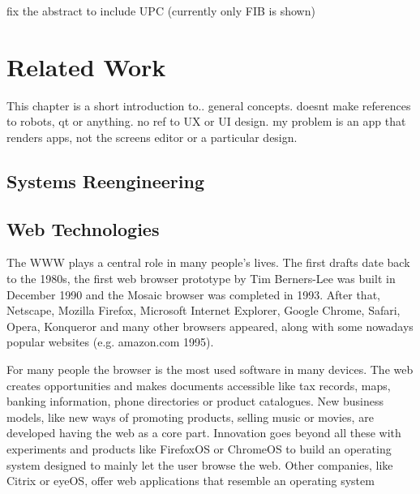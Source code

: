 
fix the abstract to include UPC (currently only FIB is shown)
\cite{Darwin} \cite{Crockford} \cite{Stefanov} \cite{AngularJSGuide} \cite{Fowler}


\chapter{Related Work}
This chapter is a short introduction to.. general concepts. doesnt make references to
robots, qt or anything. no ref to UX or UI design. my problem is an app that renders
apps, not the screens editor or a particular design.

\section{Systems Reengineering}

\section{Web Technologies}
The \ac{WWW} plays a central role in many people's lives.
The first drafts date back to the 1980s, the first web browser prototype by Tim Berners-Lee was built in December 1990 and the Mosaic browser was completed in 1993.
After that, Netscape, Mozilla Firefox, Microsoft Internet Explorer, Google Chrome, Safari, Opera, Konqueror and many other browsers appeared, along with some nowadays popular websites (e.g. amazon.com 1995).

For many people the browser is the most used software in many devices. 
The web creates opportunities and makes documents accessible like tax records, maps, banking information, phone directories or product catalogues.
New business models, like new ways of promoting products, selling music or movies, are developed having the web as a core part.
Innovation goes beyond all these with experiments and products like FirefoxOS or ChromeOS to build an operating system designed to mainly let the user browse the web. 
Other companies, like Citrix or eyeOS, offer web applications that resemble an operating system %


